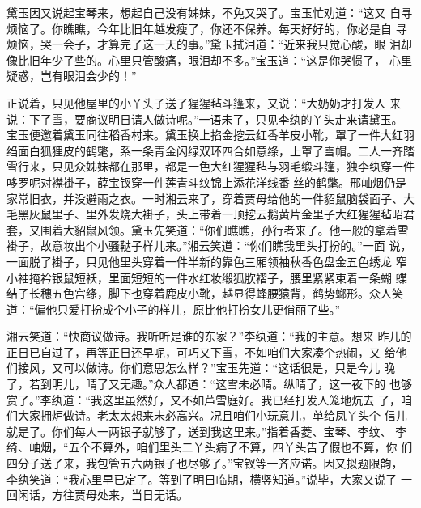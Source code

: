 黛玉因又说起宝琴来，想起自己没有姊妹，不免又哭了。宝玉忙劝道：“这又
自寻烦恼了。你瞧瞧，今年比旧年越发瘦了，你还不保养。每天好好的，你必是自
寻烦恼，哭一会子，才算完了这一天的事。”黛玉拭泪道：“近来我只觉心酸，眼
泪却像比旧年少了些的。心里只管酸痛，眼泪却不多。”宝玉道：“这是你哭惯了，
心里疑惑，岂有眼泪会少的！”

正说着，只见他屋里的小丫头子送了猩猩毡斗篷来，又说：“大奶奶才打发人
来说：下了雪，要商议明日请人做诗呢。”一语未了，只见李纨的丫头走来请黛玉。
宝玉便邀着黛玉同往稻香村来。黛玉换上掐金挖云红香羊皮小靴，罩了一件大红羽
绉面白狐狸皮的鹤氅，系一条青金闪绿双环四合如意绦，上罩了雪帽。二人一齐踏
雪行来，只见众姊妹都在那里，都是一色大红猩猩毡与羽毛缎斗篷，独李纨穿一件
哆罗呢对襟褂子，薛宝钗穿一件莲青斗纹锦上添花洋线番丝的鹤氅。邢岫烟仍是
家常旧衣，并没避雨之衣。一时湘云来了，穿着贾母给他的一件貂鼠脑袋面子、大
毛黑灰鼠里子、里外发烧大褂子，头上带着一顶挖云鹅黄片金里子大红猩猩毡昭君
套，又围着大貂鼠风领。黛玉先笑道：“你们瞧瞧，孙行者来了。他一般的拿着雪
褂子，故意妆出个小骚鞑子样儿来。”湘云笑道：“你们瞧我里头打扮的。”一面
说，一面脱了褂子，只见他里头穿着一件半新的靠色三厢领袖秋香色盘金五色绣龙
窄小袖掩衿银鼠短袄，里面短短的一件水红妆缎狐肷褶子，腰里紧紧束着一条蝴
蝶结子长穗五色宫绦，脚下也穿着鹿皮小靴，越显得蜂腰猿背，鹤势螂形。众人笑
道：“偏他只爱打扮成个小子的样儿，原比他打扮女儿更俏丽了些。”

湘云笑道：“快商议做诗。我听听是谁的东家？”李纨道：“我的主意。想来
昨儿的正日已自过了，再等正日还早呢，可巧又下雪，不如咱们大家凑个热闹，又
给他们接风，又可以做诗。你们意思怎么样？”宝玉先道：“这话很是，只是今儿
晚了，若到明儿，晴了又无趣。”众人都道：“这雪未必晴。纵晴了，这一夜下的
也够赏了。”李纨道：“我这里虽然好，又不如芦雪庭好。我已经打发人笼地炕去
了，咱们大家拥炉做诗。老太太想来未必高兴。况且咱们小玩意儿，单给凤丫头个
信儿就是了。你们每人一两银子就够了，送到我这里来。”指着香菱、宝琴、李纹、
李绮、岫烟，“五个不算外，咱们里头二丫头病了不算，四丫头告了假也不算，你
们四分子送了来，我包管五六两银子也尽够了。”宝钗等一齐应诺。因又拟题限韵，
李纨笑道：“我心里早已定了。等到了明日临期，横竖知道。”说毕，大家又说了
一回闲话，方往贾母处来，当日无话。

